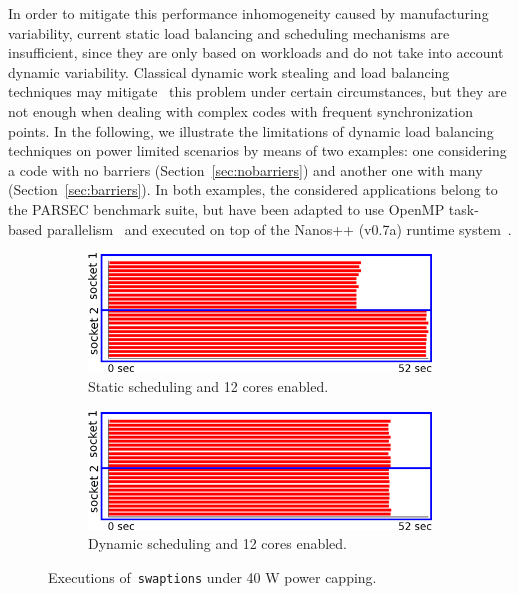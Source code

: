 In order to mitigate this performance inhomogeneity caused by manufacturing variability,
current static load balancing and scheduling mechanisms are insufficient, since they are
only based on workloads and do not take into account dynamic variability.  Classical
dynamic work stealing and load balancing techniques may mitigate~\cite{Blumofe1999,
Blumofe1995, Ravichandran2011, Zheng2011} this problem under certain circumstances, but
they are not enough when dealing with complex codes with frequent synchronization points.
In the following, we illustrate the limitations of dynamic load balancing techniques on
power limited scenarios by means of two examples: one considering a code with no barriers
(Section~\ref{sec:nobarriers}) and another one with many (Section~\ref{sec:barriers}).  In
both examples, the considered applications belong to the PARSEC benchmark suite, but have
been adapted to use OpenMP task-based parallelism~\cite{Chasapis:2015:PEI:2836331.2829952} and executed  on top
of the Nanos++ (v0.7a) runtime system~\cite{nanos}.

\begin{figure}[ht]
  \begin{subfigure}{\columnwidth}
        \includegraphics[width=\columnwidth]{power_aware_runtime/figures/swaptions-80watts-static}
        \caption{Static scheduling and 12 cores enabled.}
        \label{fig:swaptions_static_sched}
  \end{subfigure}
  \begin{subfigure}{\columnwidth}
        \includegraphics[width=\columnwidth]{power_aware_runtime/figures/swaptions-80watts-dynamic}
        \caption{Dynamic scheduling and 12 cores enabled.}
        \label{fig:swaptions_dynamic_sched}
  \end{subfigure}
  \caption{Executions of~\texttt{swaptions} 
                        under 40 W power capping.}
        \label{fig:load_balancing_sockets}
\vspace{.5cm}
\end{figure}



